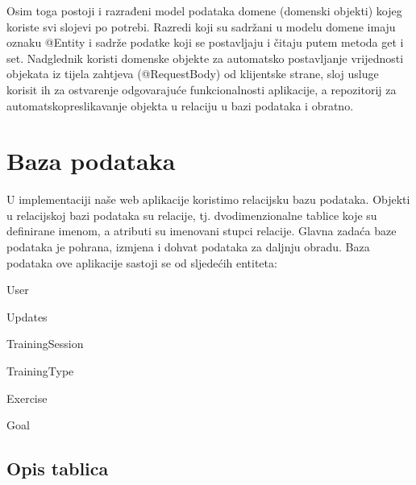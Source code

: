       {Osim toga postoji i razrađeni model podataka domene (domenski
      	objekti) kojeg koriste svi slojevi po potrebi. Razredi koji su sadržani u modelu domene imaju oznaku @Entity i sadrže podatke koji se
      	postavljaju i čitaju putem metoda get i set. Nadglednik koristi domenske objekte za automatsko postavljanje vrijednosti objekata iz tijela
      	zahtjeva (@RequestBody) od klijentske strane, sloj usluge korisit ih za ostvarenje odgovarajuće funkcionalnosti aplikacije, a repozitorij za automatskopreslikavanje objekta u relaciju u bazi podataka i obratno.}
      
      



				
		\section{Baza podataka}
		
		 {U implementaciji naše web aplikacije koristimo relacijsku bazu podataka. Objekti u relacijskoj bazi podataka su relacije, tj. dvodimenzionalne tablice koje su definirane imenom, a atributi su imenovani stupci relacije. Glavna zadaća baze podataka je pohrana, izmjena i dohvat podataka za daljnju obradu. Baza podataka ove aplikacije sastoji se od sljedećih entiteta: }
		  \begin{packed_item}
		  	\item {User}
		  	\item {Updates}
		  	\item {TrainingSession}
		  	\item {TrainingType}
		  	\item {Exercise}
		  	\item {Goal}
		  \end{packed_item}
		
			\subsection{Opis tablica}
			

